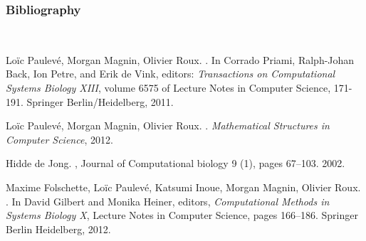 
\begin{frame}[c]
  \frametitle{Bibliography}

\footnotesize
\setlength{\parindent}{-1em}
\setlength{\parskip}{0.5em}
~

\vfill


\tcitebullet Loïc Paulevé, Morgan Magnin, Olivier Roux. . In Corrado Priami, Ralph-Johan Back, Ion Petre, and Erik de Vink, editors: \textit{Transactions on Computational Systems Biology XIII}, volume 6575 of Lecture Notes in Computer Science, 171-191. Springer Berlin/Heidelberg, 2011.

\tcitebullet Loïc Paulevé, Morgan Magnin, Olivier Roux. . \textit{Mathematical Structures in Computer Science}, 2012.



\tcitebullet Hidde de Jong. , Journal of Computational biology 9 (1), pages 67--103. 2002.

\tcitebullet Maxime Folschette, Loïc Paulevé, Katsumi Inoue, Morgan Magnin, Olivier Roux. . In David Gilbert and Monika Heiner, editors, \textit{Computational Methods in Systems Biology X}, Lecture Notes in Computer Science, pages 166–186. Springer Berlin
Heidelberg, 2012.




\vfill
\Large
\begin{flushright}
  \hspace{1cm}~
\end{flushright}
\vfill

~

\end{frame}
